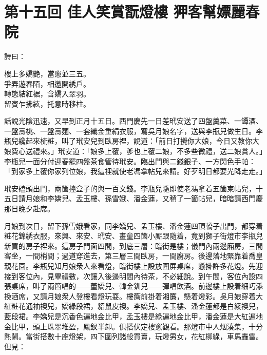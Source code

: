 
\chapter*{第十五回 佳人笑賞翫燈樓 狎客幫嫖麗春院}


詩曰：

\begin{myquote}
樓上多嬌艷，當窻並三五。\\爭弄遊春陌，相邀開綉戶。\\轉態結紅裾，含嬌入翠羽。\\留賓乍拂絃，托意時移柱。
\end{myquote}

話說光陰迅速，又早到正月十五日。西門慶先一日差玳安送了四盤羹菜、一罈酒、一盤壽桃、一盤壽麵、一套織金重絹衣服，寫吳月娘名字，送與李瓶兒做生日。李瓶兒纔起來梳粧，叫了玳安兒到臥房裡，說道：「前日打攪你大娘，今日又教你大娘費心送禮來。」玳安道：「娘多上覆，爹也上覆二娘，{}不多些微禮，送二娘賞人。」李瓶兒一面分付迎春罷四盤茶食管待玳安。臨出門與二錢銀子、一方閃色手帕：「到家多上覆你家列位娘，我這裡就使老馮拿帖兒來請。好歹明日都要光降走走。」

玳安磕頭出門，兩箇擡盒子的與一百文錢。李瓶兒隨即使老馮拿着五箇柬帖兒，十五日請月娘和李嬌兒、孟玉樓、孫雪娥、潘金蓮，又稍了一箇帖兒，暗暗請西門慶那日晚夕赴席。

月娘到次日，留下孫雪娥看家，同李嬌兒、孟玉樓、潘金蓮四頂轎子出門，都穿着粧花錦綉衣服，來興、來安、玳安、畫童四箇小厮跟隨着，竟到獅子街燈市李瓶兒新買的房子裡來。這房子門面四間，到底三層：臨街是樓；儀門內兩邊廂房，三間客坐，一間梢間；過道穿進去，第三層三間臥房，一間廚房。後邊落地緊靠着喬皇親花園。{}李瓶兒知月娘衆人來看燈，臨街樓上設放圍屏桌席，懸掛許多花燈。先迎接到客位內，見畢禮數，次讓入後邊明間內待茶，不必細說。到午間，客位內設四張桌席，叫了兩箇唱的——董嬌兒、韓金釧兒——彈唱飲酒。前邊樓上設着細巧添換酒席，又請月娘衆人登樓看燈玩耍。樓簷前掛着湘簾，懸着燈彩。吳月娘穿着大紅粧花通袖襖兒，嬌綠段裙，貂鼠皮襖。李嬌兒、孟玉樓、潘金蓮都是白綾襖兒，藍段裙。李嬌兒是沉香色遍地金比甲，孟玉樓是綠遍地金比甲，潘金蓮是大紅遍地金比甲，頭上珠翠堆盈，鳳釵半卸。俱搭伏定樓窻觀看。那燈市中人烟湊集，十分熱鬧。當街搭數十座燈架，四下圍列諸般買賣，玩燈男女，花紅柳綠，車馬轟雷。但見：

